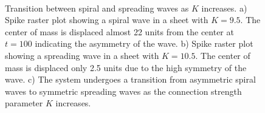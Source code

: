 \documentclass[12pt]{article}
\begin{document}
\begin{figure}[!htb]
 \caption{Transition between spiral and spreading waves as $K$ increases.
          a) Spike raster plot showing a spiral wave in a sheet with $K=9.5$. The center of mass is displaced almost 22 units from the center at $t=100$ indicating the asymmetry of the wave.
          b) Spike raster plot showing a spreading wave in a sheet with $K=10.5$. The center of mass is displaced only 2.5 units due to the high symmetry of the wave.
          c) The system undergoes a transition from asymmetric spiral waves to symmetric spreading waves as the connection strength parameter $K$ increases.
          } 
     \\
 \label{fig:2DWaveTransition}
\end{figure}
 \FloatBarrier
\end{document}
